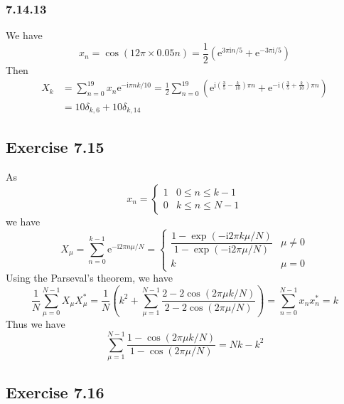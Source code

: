 \documentclass[]{ctexart}
\begin{document}
\subsubsection*{7.14.13}
We have 
\begin{equation*}
x_n=\cos(12\pi\times 0.05 n)=\frac{1}{2}\left(\mathrm{e}^{3\pi\mathrm{i}n/5}+\mathrm{e}^{-3\pi\mathrm{i}/5}\right)
\end{equation*}
Then 
\begin{align*}
X_k&=\sum_{n=0}^{19}x_n\mathrm{e}^{-\mathrm{i}\pi nk/10}=\frac{1}{2}\sum_{n=0}^{19}\left(\mathrm{e}^{\mathrm{i}\left(\frac{3}{5}-\frac{k}{10}\right)\pi n}+\mathrm{e}^{-\mathrm{i}\left(\frac{3}{5}+\frac{k}{10}\right)\pi n}\right)\\
&=10\delta_{k,6}+10\delta_{k,14}
\end{align*}

\subsection{Exercise 7.15}
As 
\begin{equation*}
x_n=\begin{cases}
1 & 0\le n\le k-1\\
0 & k\le n\le N-1
\end{cases}
\end{equation*}
we have 
\begin{equation*}
X_\mu=\sum_{n=0}^{k-1}\mathrm{e}^{-\mathrm{i}2\pi n\mu /N}=\begin{cases}
\dfrac{1-\exp(-\mathrm{i}2\pi k\mu/N)}{1-\exp(-\mathrm{i}2\pi \mu/N)} & \mu\ne 0\\
k & \mu=0
\end{cases}
\end{equation*}
Using the Parseval's theorem, we have 
\begin{equation*}
\frac{1}{N}\sum_{\mu=0}^{N-1}X_\mu X_\mu^*=\frac{1}{N}\left(k^2+\sum_{\mu=1}^{N-1}\frac{2-2\cos(2\pi\mu k/N)}{2-2\cos(2\pi\mu/N)}\right)=\sum_{n=0}^{N-1}x_n x_n^*=k
\end{equation*}
Thus we have 
\begin{equation*}
\sum_{\mu=1}^{N-1}\frac{1-\cos(2\pi\mu k/N)}{1-\cos(2\pi\mu/N)}=Nk-k^2
\end{equation*}

\subsection{Exercise 7.16}
\end{document}
